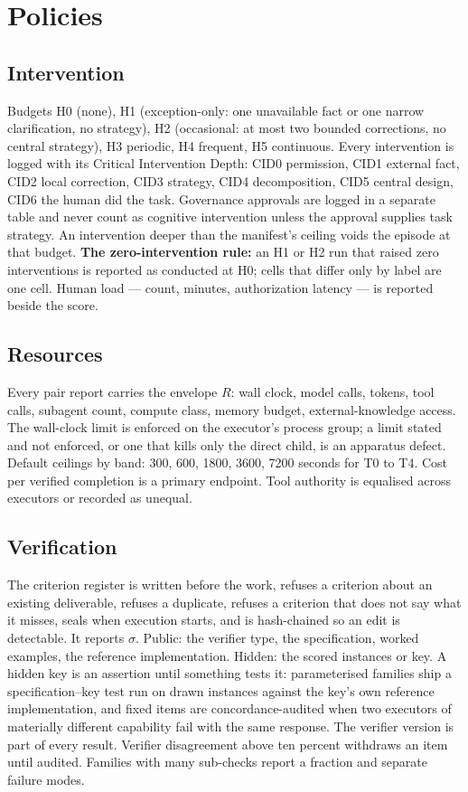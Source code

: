 \documentclass[11pt]{article}
\theoremstyle{definition}
\begin{document}
\section{Policies}\label{sec:policies}

\subsection{Intervention}

Budgets H0 (none), H1 (exception-only: one unavailable fact or one narrow clarification, no strategy), H2 (occasional: at most two bounded corrections, no central strategy), H3 periodic, H4 frequent, H5 continuous. Every intervention is logged with its Critical Intervention Depth: CID0 permission, CID1 external fact, CID2 local correction, CID3 strategy, CID4 decomposition, CID5 central design, CID6 the human did the task. Governance approvals are logged in a separate table and never count as cognitive intervention unless the approval supplies task strategy. An intervention deeper than the manifest's ceiling voids the episode at that budget. \textbf{The zero-intervention rule:} an H1 or H2 run that raised zero interventions is reported as conducted at H0; cells that differ only by label are one cell. Human load --- count, minutes, authorization latency --- is reported beside the score.

\subsection{Resources}

Every pair report carries the envelope $R$: wall clock, model calls, tokens, tool calls, subagent count, compute class, memory budget, external-knowledge access. The wall-clock limit is enforced on the executor's process group; a limit stated and not enforced, or one that kills only the direct child, is an apparatus defect. Default ceilings by band: 300, 600, 1800, 3600, 7200 seconds for T0 to T4. Cost per verified completion is a primary endpoint. Tool authority is equalised across executors or recorded as unequal.

\subsection{Verification}

The criterion register is written before the work, refuses a criterion about an existing deliverable, refuses a duplicate, refuses a criterion that does not say what it misses, seals when execution starts, and is hash-chained so an edit is detectable. It reports $\sigma$. Public: the verifier type, the specification, worked examples, the reference implementation. Hidden: the scored instances or key. A hidden key is an assertion until something tests it: parameterised families ship a specification--key test run on drawn instances against the key's own reference implementation, and fixed items are concordance-audited when two executors of materially different capability fail with the same response. The verifier version is part of every result. Verifier disagreement above ten percent withdraws an item until audited. Families with many sub-checks report a fraction and separate failure modes.
\end{document}
